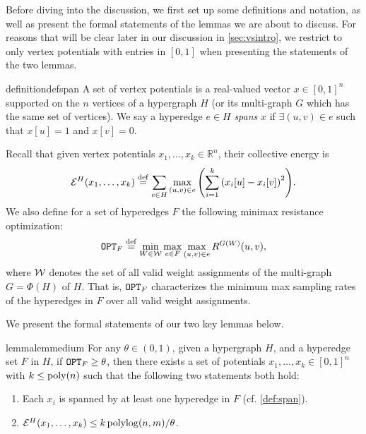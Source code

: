 \documentclass{article}
\begin{document}
Before diving into the discussion,
we first set up some definitions and notation, as well as present
the formal statements of the lemmas we are about to discuss.
For reasons that will be clear later in our discussion in \cref{sec:vsintro},
we restrict to only vertex potentials with entries in $[0,1]$ when presenting the statements
of the two lemmas.

\begin{restatable}{definition}{defspan}
\label{def:span}
    A set of vertex potentials is a
    real-valued vector $x\in [0,1]^{n}$ supported
    on the $n$ vertices of a hypergraph $H$ (or its multi-graph $G$ which
    has the same set of vertices).
    We say a hyperedge $e\in H$ \textit{spans} $x$ if
    $\exists (u,v)\in e$ such that $x[u] = 1$ and $x[v] = 0$.
\end{restatable}
Recall that given vertex potentials $x_1,\ldots,x_k\in\mathbb{R}^{n}$,
    their collective energy is
    \begin{align*}
        \mathcal{E}^H(x_1,\ldots,x_k) \stackrel{\mathrm{def}}{=}
        \sum_{e\in H}
        {\max_{(u,v)\in e} 
        \left( \sum_{i=1}^{k} \left(x_i[u] - x_i[v]\right)^2 \right)
        }.
    \end{align*}
We also define
    for a set of hyperedges $F$ the following minimax resistance optimization:
    \begin{align*}
        \mathtt{OPT}_F \stackrel{\mathrm{def}}{=}
        \min_{W\in \mathcal{W}} \max_{e\in F}
        \max_{(u,v)\in e} R^{G(W)}(u,v),
    \end{align*}
    where $\mathcal{W}$ denotes the set of all valid weight assignments of the multi-graph
    $G=\Phi(H)$ of $H$.
    That is, $\mathtt{OPT}_F$ characterizes
    the minimum max sampling rates of the hyperedges in $F$
    over all valid weight assignments.

We present the formal statements of our two key lemmas
below.

\begin{restatable}{lemma}{lemmedium}
\label{lem:medium}
    For any $\theta\in(0,1)$,
    given a hypergraph
    $H$, 
    and a hyperedge set $F$ in $H$,
    if $\mathtt{OPT}_F \geq \theta$,
    then
    there exists a set of potentials $x_1,\ldots,x_k\in[0,1]^{n}$
    with $k\leq\mathrm{poly}(n)$
    such that
    the following two statements both hold:
    \begin{enumerate}
        \item Each $x_i$ is spanned by at least one hyperedge in $F$
        (cf. \cref{def:span}).
        \item $\mathcal{E}^H(x_1,\ldots,x_k) \leq k \operatorname{polylog}(n,m) / \theta$.
    \end{enumerate}
\end{restatable}
\end{document}
